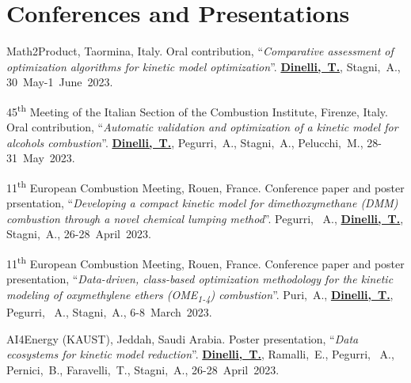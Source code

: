 
\section{\sc Conferences and Presentations}
\begin{etaremune}
   \item
      Math2Product, Taormina, Italy. Oral contribution, ``\textit{Comparative
      assessment of optimization algorithms for kinetic model optimization}''.
      \textbf{\underline{Dinelli,~T.}}, Stagni,~A.,
      30~May-1~June~2023.

   \item
      45\textsuperscript{th} Meeting of the Italian Section of the Combustion Institute,
      Firenze, Italy. Oral contribution, ``\textit{Automatic validation and optimization
      of a kinetic model for alcohols combustion}''. \textbf{\underline{Dinelli,~T.}},
      Pegurri,~A., Stagni,~A., Pelucchi,~M.,
      28-31~May~2023.

   \item
      11\textsuperscript{th} European Combustion Meeting, Rouen, France. Conference paper
      and poster prsentation, ``\textit{Developing a compact kinetic model for
      dimethoxymethane (DMM) combustion through a novel chemical lumping method}''.
      Pegurri, ~A., \textbf{\underline{Dinelli,~T.}}, Stagni,~A.,
      26-28~April~2023.

   \item
      11\textsuperscript{th} European Combustion Meeting, Rouen, France. Conference paper
      and poster presentation, ``\textit{Data-driven, class-based optimization methodology
      for the kinetic modeling of oxymethylene ethers (OME\textsubscript{1-4}) combustion}''.
      Puri,~A., \textbf{\underline{Dinelli,~T.}}, Pegurri, ~A., Stagni,~A.,
      6-8~March~2023.

   \item
      AI4Energy (KAUST), Jeddah, Saudi Arabia. Poster presentation, ``\textit{Data ecosystems for
      kinetic model reduction}''. \textbf{\underline{Dinelli,~T.}}, Ramalli,~E., Pegurri,
      ~A., Pernici,~B., Faravelli,~T., Stagni,~A.,
      26-28~April~2023.


\end{etaremune}
